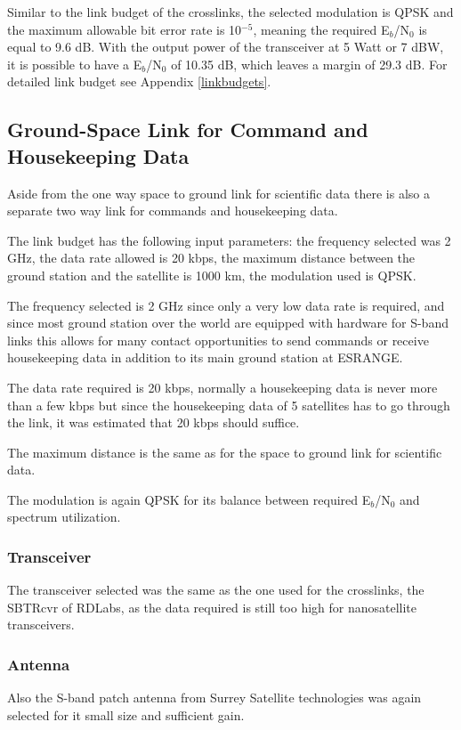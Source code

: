 Similar to the link budget of the crosslinks, the selected modulation is QPSK and the maximum allowable bit error rate is 10$^{-5}$, meaning the required E$_{b}$/N$_{0}$ is equal to 9.6 dB. With the output power of the transceiver at 5 Watt or 7 dBW, it is possible to have a E$_{b}$/N$_{0}$ of 10.35 dB, which leaves a margin of 29.3 dB. For detailed link budget see Appendix \ref{linkbudgets}.

\subsection{Ground-Space Link for Command and Housekeeping Data}
Aside from the one way space to ground link for scientific data there is also a separate two way link for commands and housekeeping data. 

The link budget has the following input parameters: the frequency selected was 2 GHz, the data rate allowed is 20 kbps, the maximum distance between the ground station and the satellite is 1000 km, the modulation used is QPSK.

The frequency selected is 2 GHz since only a very low data rate is required, and since most ground station over the world are equipped with hardware for S-band links this allows for many contact opportunities to send commands or receive housekeeping data in addition to its main ground station at ESRANGE.

The data rate required is 20 kbps, normally a housekeeping data is never more than a few kbps \cite{satcom} but since the housekeeping data of 5 satellites has to go through the link, it was estimated that 20 kbps should suffice.

The maximum distance is the same as for the space to ground link for scientific data.

The modulation is again QPSK for its balance between required E$_{b}$/N$_{0}$ and spectrum utilization.

\subsubsection{Transceiver}
The transceiver selected was the same as the one used for the crosslinks, the SBTRcvr of RDLabs, as the data required is still too high for nanosatellite transceivers.
\subsubsection{Antenna}
Also the S-band patch antenna from Surrey Satellite technologies was again selected for it small size and sufficient gain.
